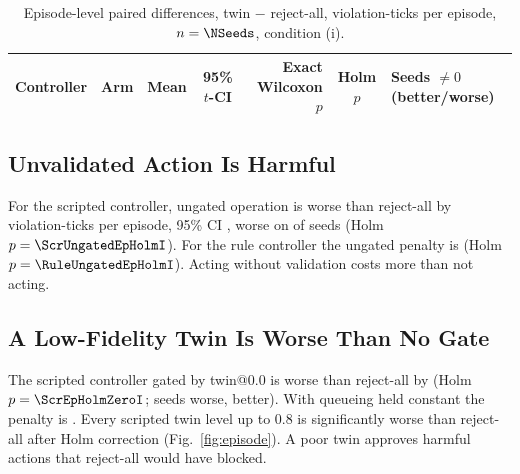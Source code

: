 \documentclass[conference]{IEEEtran}
\begin{document}
\begin{table}[t]
\centering
\caption{Episode-level paired differences, twin $-$ reject-all, violation-ticks per episode, $n=\NSeeds$, condition (i).}
\label{tab:episode}
\footnotesize
\setlength{\tabcolsep}{6pt}
\begin{tabular}{@{}llrcrcl@{}}
\toprule
Controller & Arm & Mean & 95\% $t$-CI & Exact Wilcoxon $p$ & Holm $p$ & Seeds $\neq 0$ (better/worse) \\
\midrule
\bottomrule
\end{tabular}
\end{table}

\subsection{Unvalidated Action Is Harmful}
For the scripted controller, ungated operation is worse than reject-all by \ScrUngatedEpI{} violation-ticks per episode, 95\% CI \ScrUngatedEpCII, worse on \ScrUngatedEpWorseI{} of \NSeeds{} seeds (Holm $p=\ScrUngatedEpHolmI$). For the rule controller the ungated penalty is \RuleUngatedEpI{} \RuleUngatedEpCII{} (Holm $p=\RuleUngatedEpHolmI$). Acting without validation costs more than not acting.

\subsection{A Low-Fidelity Twin Is Worse Than No Gate}
The scripted controller gated by twin@0.0 is worse than reject-all by \ScrEpZeroI{} \ScrEpCIZeroI{} (Holm $p=\ScrEpHolmZeroI$; \ScrEpWorseZeroI{} seeds worse, \ScrEpBetterZeroI{} better). With queueing held constant the penalty is \ScrEpZeroII{} \ScrEpCIZeroII. Every scripted twin level up to 0.8 is significantly worse than reject-all after Holm correction (Fig.~\ref{fig:episode}). A poor twin approves harmful actions that reject-all would have blocked.
\end{document}
